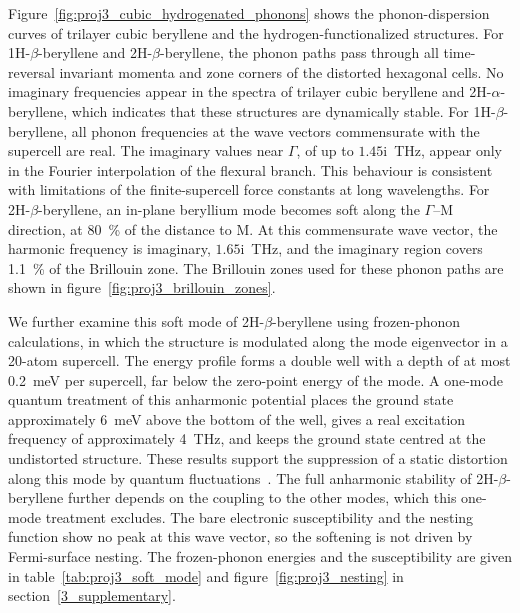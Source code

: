 Figure~\ref{fig:proj3_cubic_hydrogenated_phonons} shows the phonon-dispersion curves of trilayer cubic beryllene and the hydrogen-functionalized structures.
For 1H-$\beta$-beryllene and 2H-$\beta$-beryllene,
the phonon paths pass through all time-reversal invariant momenta and zone corners of the distorted hexagonal cells.
No imaginary frequencies appear in the spectra of trilayer cubic beryllene and 2H-$\alpha$-beryllene,
which indicates that these structures are dynamically stable.
For 1H-$\beta$-beryllene,
all phonon frequencies at the wave vectors commensurate with the supercell are real.
The imaginary values near $\Gamma$,
of up to $1.45\mathrm{i}$~\si{\tera\hertz},
appear only in the Fourier interpolation of the flexural branch.
This behaviour is consistent with limitations of the finite-supercell force constants at long wavelengths.
For 2H-$\beta$-beryllene,
an in-plane beryllium mode becomes soft along the $\Gamma$--$\mathrm{M}$ direction,
at \qty{80}{\percent} of the distance to $\mathrm{M}$.
At this commensurate wave vector,
the harmonic frequency is imaginary,
$1.65\mathrm{i}$~\si{\tera\hertz},
and the imaginary region covers \qty{1.1}{\percent} of the Brillouin zone.
The Brillouin zones used for these phonon paths are shown in figure~\ref{fig:proj3_brillouin_zones}.

We further examine this soft mode of 2H-$\beta$-beryllene using frozen-phonon calculations,
in which the structure is modulated along the mode eigenvector in a 20-atom supercell.
The energy profile forms a double well with a depth of at most \qty{0.2}{\milli\electronvolt} per supercell,
far below the zero-point energy of the mode.
A one-mode quantum treatment of this anharmonic potential places the ground state approximately \qty{6}{\milli\electronvolt} above the bottom of the well,
gives a real excitation frequency of approximately \qty{4}{\tera\hertz},
and keeps the ground state centred at the undistorted structure.
These results support the suppression of a static distortion along this mode by quantum fluctuations~\cite{verdi2023quantum,ranalli2023temperature}.
The full anharmonic stability of 2H-$\beta$-beryllene further depends on the coupling to the other modes,
which this one-mode treatment excludes.
The bare electronic susceptibility and the nesting function show no peak at this wave vector,
so the softening is not driven by Fermi-surface nesting.
The frozen-phonon energies and the susceptibility are given in table~\ref{tab:proj3_soft_mode} and figure~\ref{fig:proj3_nesting} in section~\ref{3_supplementary}.

